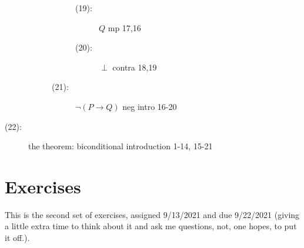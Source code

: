 \documentclass[12pt]{article}
\begin{document}
\begin{description}
\begin{description}
\begin{description}
\begin{description}
\item[(19):]  $Q$ mp 17,16

\item[(20):]  $\perp$  contra 18,19

\end{description}

\item[(21):]  $\neg(P \rightarrow Q)$ neg intro 16-20

\end{description}



\end{description}

\item[(22):]  the theorem:  biconditional introduction 1-14, 15-21

\end{description}

\newpage

\section{Exercises}

This is the second set of exercises, assigned 9/13/2021 and due 9/22/2021 (giving a little extra time to think about it and ask me questions, not, one hopes, to put it off.).
\end{document}
